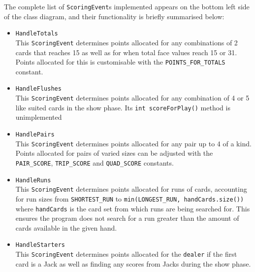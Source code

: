 \documentclass{article}
\begin{document}
The complete list of \verb|ScoringEvent|s implemented appears on the bottom left side of the class diagram, and their functionality is briefly summarised below:
\begin{multicols}{2}
    \begin{itemize}
        \item \verb|HandleTotals|\\[2mm]
        This \verb|ScoringEvent| determines points allocated for any combinations of 2 cards that reaches 15 as well as for when total face values reach 15 or 31. Points allocated for this is customisable with the \verb|POINTS_FOR_TOTALS| constant.
        \item \verb|HandleFlushes|\\[2mm]
        This \verb|ScoringEvent| determines points allocated for any combination of 4 or 5 like suited cards in the show phase. Its \verb|int scoreForPlay()| method is unimplemented
        \item \verb|HandlePairs|\\[2mm]
        This \verb|ScoringEvent| determines points allocated for any pair up to 4 of a kind. Points allocated for pairs of varied sizes can be adjusted with the \verb|PAIR_SCORE|, \verb|TRIP_SCORE| and \verb|QUAD_SCORE| constants.
        \item \verb|HandleRuns|\\[2mm]
        This \verb|ScoringEvent| determines points allocated for runs of cards, accounting for run sizes from \verb|SHORTEST_RUN| to \verb|min(LONGEST_RUN, handCards.size())| where \verb|handCards| is the card set from which runs are being searched for. This ensures the program does not search for a run greater than the amount of cards available in the given hand.
        \item \verb|HandleStarters|\\[2mm]
        This \verb|ScoringEvent| determines points allocated for the \verb|dealer| if the first card is a Jack as well as finding any scores from Jacks during the show phase.
    \end{itemize}
\end{multicols}
\end{document}
